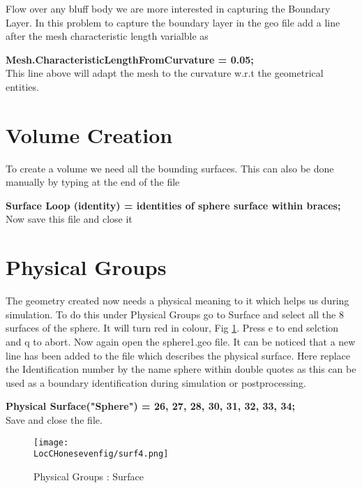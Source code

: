Flow over any bluff body we are more interested in capturing the Boundary Layer. In this problem to capture the boundary layer in the geo file add a line after the mesh characteristic length varialble as \newline

\centering  \textbf{Mesh.CharacteristicLengthFromCurvature = 0.05;} \\

\flushleft This line above will adapt the mesh to the curvature w.r.t the geometrical entities.

\section{Volume Creation}

To create a volume we need all the bounding surfaces. This can also be done manually by typing at the end of the file \newline

\centering \textbf{Surface Loop (identity) = {identities of sphere surface within braces};} \\

\flushleft Now save this file and close it

\section{Physical Groups}

The geometry created now needs a physical meaning to it which helps us during simulation. To do this under Physical Groups go to Surface and select all the 8 surfaces of the sphere. It will turn red in colour, Fig \ref{surf4}. Press e to end selction and q to abort. Now again open the sphere1.geo file. It can be noticed that a new line has been added to the file which describes the physical surface. Here replace the Identification number by the name sphere within double quotes as this can be used as a boundary identification during simulation or postprocessing.\newline

\centering \textbf{Physical Surface("Sphere") = {26, 27, 28, 30, 31, 32, 33, 34};} \\

\flushleft Save and close the file. 

\begin{figure}[h]  
\centering
\texttt{[image: \\LocCHonesevenfig/surf4.png]}
\caption{Physical Groups : Surface}
\label{surf4}
\end{figure}
 


